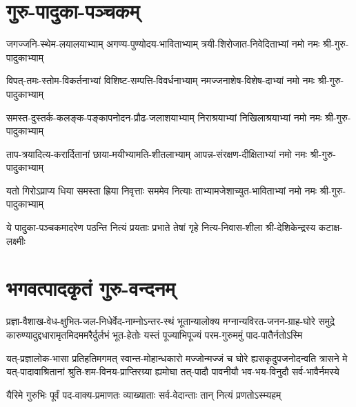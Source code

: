 
\section{गुरु-पादुका-पञ्चकम्}


\twolineshloka
{जगज्जनि-स्थेम-लयालयाभ्याम् अगण्य-पुण्योदय-भाविताभ्याम्}
{त्रयी-शिरोजात-निवेदिताभ्यां नमो नमः श्री-गुरु-पादुकाभ्याम्}

\twolineshloka
{विपत्-तमः-स्तोम-विकर्तनाभ्यां विशिष्ट-सम्पत्ति-विवर्धनाभ्याम्}
{नमज्जनाशेष-विशेष-दाभ्यां नमो नमः श्री-गुरु-पादुकाभ्याम्}

\twolineshloka
{समस्त-दुस्तर्क-कलङ्क-पङ्कापनोदन-प्रौढ-जलाशयाभ्याम्}
{निराश्रयाभ्यां निखिलाश्रयाभ्यां नमो नमः श्री-गुरु-पादुकाभ्याम्}

\twolineshloka
{ताप-त्रयादित्य-करार्दितानां छाया-मयीभ्यामति-शीतलाभ्याम्}
{आपन्न-संरक्षण-दीक्षिताभ्यां नमो नमः श्री-गुरु-पादुकाभ्याम्}

\twolineshloka
{यतो गिरोऽप्राप्य धिया समस्ता ह्रिया निवृत्ताः सममेव नित्याः}
{ताभ्यामजेशाच्युत-भाविताभ्यां नमो नमः श्री-गुरु-पादुकाभ्याम्}

\twolineshloka
{ये पादुका-पञ्चकमादरेण पठन्ति नित्यं प्रयताः प्रभाते}
{तेषां गृहे नित्य-निवास-शीला श्री-देशिकेन्द्रस्य कटाक्ष-लक्ष्मीः}


\section{भगवत्पादकृतं गुरु-वन्दनम्}

\fourlineindentedshloka
{प्रज्ञा-वैशाख-वेध-क्षुभित-जल-निधेर्वेद-नाम्नोऽन्तर-स्थं}
{भूतान्यालोक्य मग्नान्यविरत-जनन-ग्राह-घोरे समुद्रे}
{कारुण्यादुद्दधारामृतमिदममरैर्दुर्लभं भूत-हेतोः}
{यस्तं पूज्याभिपूज्यं परम-गुरुममुं पाद-पातैर्नतोऽस्मि}

\fourlineindentedshloka
{यत्-प्रज्ञालोक-भासा प्रतिहतिमगमत् स्वान्त-मोहान्धकारो}
{मज्जोन्मज्जं च घोरे ह्यसकृदुपजनोदन्वति त्रासने मे}
{यत्-पादावाश्रितानां श्रुति-शम-विनय-प्राप्तिरग्र्या ह्यमोघा}
{तत्-पादौ पावनीयौ भव-भय-विनुदौ सर्व-भावैर्नमस्ये}


\twolineshloka
{यैरिमे गुरुभिः पूर्वं पद-वाक्य-प्रमाणतः}
{व्याख्याताः सर्व-वेदान्ताः तान् नित्यं प्रणतोऽस्म्यहम्}


